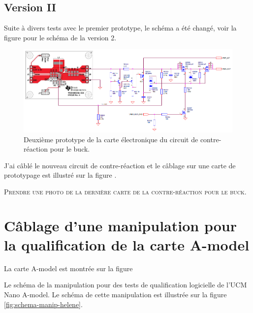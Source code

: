 \subsection{Version II}

Suite à divers tests avec le premier prototype, le schéma a été changé, voir la figure  pour le schéma de la version 2.

\begin{figure}[H]
    \centering
    \includegraphics[width=1.00\textwidth]{images/circuit-contre-reaction-buck-v2}
    \caption{Deuxième prototype de la carte électronique du circuit de contre-réaction pour le buck.}
    \label{fig:circuit-contre-reaction-buck-v2}
\end{figure}


J'ai câblé le nouveau circuit de contre-réaction et le câblage sur une carte de prototypage est illustré sur la figure . 


\textsc{Prendre une photo de la dernière carte de la contre-réaction pour le buck.}






\section{Câblage d'une manipulation pour la qualification de la carte A-model}

La carte A-model est montrée sur la figure 




Le schéma de la manipulation pour des tests de qualification logicielle de l'UCM Nano A-model. Le schéma de cette manipulation est illustrée sur la figure \ref{fig:schema-manip-helene}.


